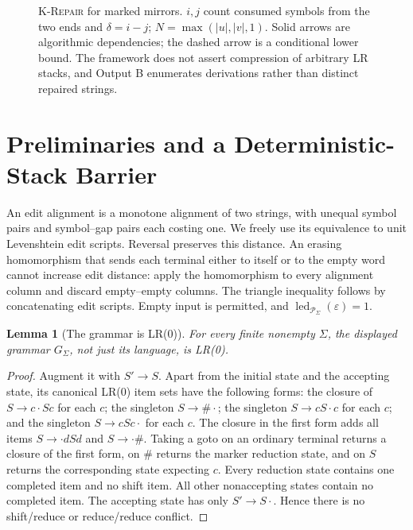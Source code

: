 \documentclass[sigconf,screen]{acmart}
\newcommand{\LED}{\operatorname{led}}
\newcommand{\Pal}{\mathcal P}
\newcommand{\eps}{\varepsilon}
\newcommand{\krepair}{\textsc{K-Repair}}
\newtheorem{lemma}[theorem]{Lemma}
\theoremstyle{definition}
\begin{document}
\begin{figure}[t]
\caption{\krepair{} for marked mirrors. $i,j$ count consumed symbols from the two ends and $\delta=i-j$; $N=\max(|u|,|v|,1)$. Solid arrows are algorithmic dependencies; the dashed arrow is a conditional lower bound. The framework does not assert compression of arbitrary LR stacks, and Output B enumerates derivations rather than distinct repaired strings.}
\label{fig:framework}
\end{figure}

\section{Preliminaries and a Deterministic-Stack Barrier}
An edit alignment is a monotone alignment of two strings, with unequal symbol pairs and symbol--gap pairs each costing one. We freely use its equivalence to unit Levenshtein edit scripts. Reversal preserves this distance. An erasing homomorphism that sends each terminal either to itself or to the empty word cannot increase edit distance: apply the homomorphism to every alignment column and discard empty--empty columns. The triangle inequality follows by concatenating edit scripts. Empty input is permitted, and $\LED_{\Pal_\Sigma}(\eps)=1$.

\begin{lemma}[The grammar is LR(0)]\label{lem:lr}
For every finite nonempty $\Sigma$, the displayed grammar $G_\Sigma$, not just its language, is LR(0).
\end{lemma}
\begin{proof}
Augment it with $S'\to S$. Apart from the initial state and the accepting state, its canonical LR(0) item sets have the following forms: the closure of $S\to c\mathbin\cdot S c$ for each $c$; the singleton $S\to\#\mathbin\cdot$; the singleton $S\to cS\mathbin\cdot c$ for each $c$; and the singleton $S\to cSc\mathbin\cdot$ for each $c$. The closure in the first form adds all items $S\to\mathbin\cdot dSd$ and $S\to\mathbin\cdot\#$. Taking a goto on an ordinary terminal returns a closure of the first form, on $\#$ returns the marker reduction state, and on $S$ returns the corresponding state expecting $c$. Every reduction state contains one completed item and no shift item. All other nonaccepting states contain no completed item. The accepting state has only $S'\to S\mathbin\cdot$. Hence there is no shift/reduce or reduce/reduce conflict.
\end{proof}
\end{document}
